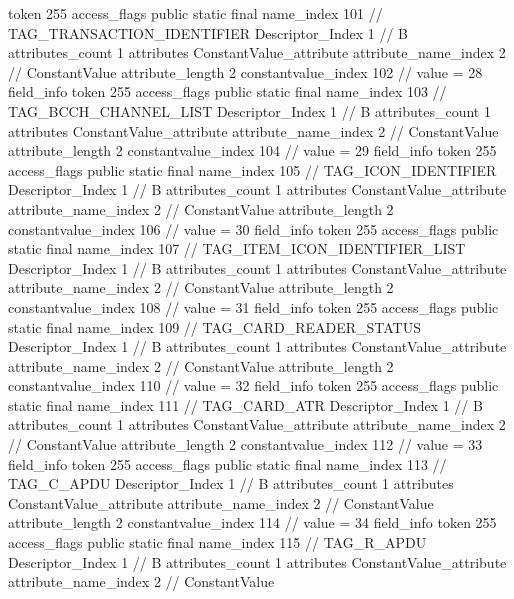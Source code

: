 {{{{{				token	255
				access_flags	public static final
				name_index	101		// TAG_TRANSACTION_IDENTIFIER
				Descriptor_Index	1		// B
				attributes_count	1
				attributes {
				ConstantValue_attribute {
					attribute_name_index	2		// ConstantValue
					attribute_length	2
					constantvalue_index	102		// value = 28
				}
				}
			}
			field_info {
				token	255
				access_flags	public static final
				name_index	103		// TAG_BCCH_CHANNEL_LIST
				Descriptor_Index	1		// B
				attributes_count	1
				attributes {
				ConstantValue_attribute {
					attribute_name_index	2		// ConstantValue
					attribute_length	2
					constantvalue_index	104		// value = 29
				}
				}
			}
			field_info {
				token	255
				access_flags	public static final
				name_index	105		// TAG_ICON_IDENTIFIER
				Descriptor_Index	1		// B
				attributes_count	1
				attributes {
				ConstantValue_attribute {
					attribute_name_index	2		// ConstantValue
					attribute_length	2
					constantvalue_index	106		// value = 30
				}
				}
			}
			field_info {
				token	255
				access_flags	public static final
				name_index	107		// TAG_ITEM_ICON_IDENTIFIER_LIST
				Descriptor_Index	1		// B
				attributes_count	1
				attributes {
				ConstantValue_attribute {
					attribute_name_index	2		// ConstantValue
					attribute_length	2
					constantvalue_index	108		// value = 31
				}
				}
			}
			field_info {
				token	255
				access_flags	public static final
				name_index	109		// TAG_CARD_READER_STATUS
				Descriptor_Index	1		// B
				attributes_count	1
				attributes {
				ConstantValue_attribute {
					attribute_name_index	2		// ConstantValue
					attribute_length	2
					constantvalue_index	110		// value = 32
				}
				}
			}
			field_info {
				token	255
				access_flags	public static final
				name_index	111		// TAG_CARD_ATR
				Descriptor_Index	1		// B
				attributes_count	1
				attributes {
				ConstantValue_attribute {
					attribute_name_index	2		// ConstantValue
					attribute_length	2
					constantvalue_index	112		// value = 33
				}
				}
			}
			field_info {
				token	255
				access_flags	public static final
				name_index	113		// TAG_C_APDU
				Descriptor_Index	1		// B
				attributes_count	1
				attributes {
				ConstantValue_attribute {
					attribute_name_index	2		// ConstantValue
					attribute_length	2
					constantvalue_index	114		// value = 34
				}
				}
			}
			field_info {
				token	255
				access_flags	public static final
				name_index	115		// TAG_R_APDU
				Descriptor_Index	1		// B
				attributes_count	1
				attributes {
				ConstantValue_attribute {
					attribute_name_index	2		// ConstantValue
}}}}}}}
